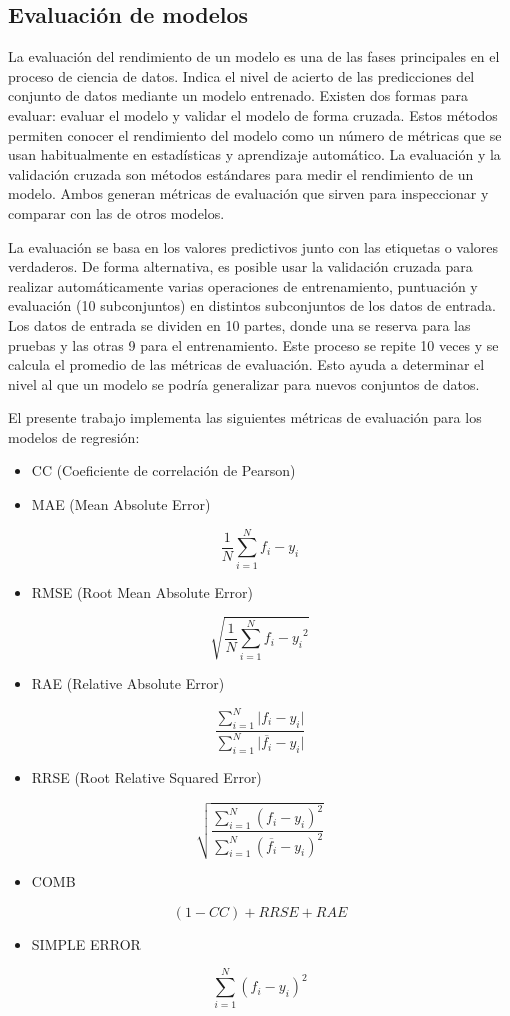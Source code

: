 \subsection{Evaluación de modelos}

La evaluación del rendimiento de un modelo es una de las fases principales
en el proceso de ciencia de datos. Indica el nivel de acierto de las
predicciones del conjunto de datos mediante un modelo entrenado. Existen
dos formas para evaluar: evaluar el modelo y validar el modelo de
forma cruzada. Estos métodos permiten conocer el rendimiento del modelo
como un número de métricas que se usan habitualmente en estadísticas
y aprendizaje automático. La evaluación y la validación cruzada son
métodos estándares para medir el rendimiento de un modelo. Ambos generan
métricas de evaluación que sirven para inspeccionar y comparar con
las de otros modelos. 

La evaluación se basa en los valores predictivos junto con las etiquetas
o valores verdaderos. De forma alternativa, es posible usar la validación
cruzada para realizar automáticamente varias operaciones de entrenamiento,
puntuación y evaluación (10 subconjuntos) en distintos subconjuntos
de los datos de entrada. Los datos de entrada se dividen en 10 partes,
donde una se reserva para las pruebas y las otras 9 para el entrenamiento.
Este proceso se repite 10 veces y se calcula el promedio de las métricas
de evaluación. Esto ayuda a determinar el nivel al que un modelo se
podría generalizar para nuevos conjuntos de datos. 

El presente trabajo implementa las siguientes métricas de evaluación
para los modelos de regresión: 
\begin{itemize}
\item CC (Coeficiente de correlación de Pearson)
\item MAE (Mean Absolute Error) 
\end{itemize}
\[ \frac{1}{N}\sum_{i=1}^{N}{f_i-y_i}
\]
\begin{itemize}
\item RMSE (Root Mean Absolute Error)
\end{itemize}
\[ \sqrt{\frac{1}{N}\sum_{i=1}^{N}{f_i-y_i}^2}
\]
\begin{itemize}
\item RAE (Relative Absolute Error)
\end{itemize}
\[ \frac{\sum_{i=1}^{N}{|f_i-y_i}|}{\sum_{i=1}^{N}{|\overline{f_i}-y_i}|}
\]
\begin{itemize}
\item RRSE (Root Relative Squared Error)
\end{itemize}
\[ \sqrt{\frac{\sum_{i=1}^{N}{(f_i-y_i)^2}}{\sum_{i=1}^{N}{(\overline{f_i}-y_i)^2}}}
\]
\begin{itemize}
\item COMB
\end{itemize}
\[ (1-CC)+RRSE+RAE
\]
\begin{itemize}
\item SIMPLE ERROR
\end{itemize}
\[ \sum_{i=1}^{N}{(f_i-y_i)^2}
\]

